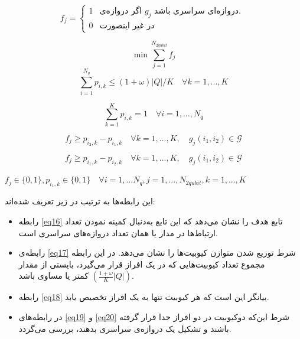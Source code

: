 \[
f_{j}=
\begin{cases}
 1& \text{اگر دروازه‌ی $g_j$ دروازه‌ای سراسری باشد. }\\
0& \text{در غیر اینصورت}
 \end{cases}
\]


\begin{equation}
\min \sum\limits_{j=1}^{N_{2qubit}} f_{j} 
\label{eq16}
\end{equation}
\begin{equation}
\sum\limits_{i=1}^{N_{q}} p_{i,k} \leq (1+\omega)|Q| /K \quad \forall k=1,...,K
\label{eq17}
\end{equation}

\begin{equation}
\sum\limits_{k=1}^K p_{i,k}=1    \quad \forall i=1,...,N_q
\label{eq18}
\end{equation}

\begin{equation}
f_{j}\geq p_{i_2,k}-p_{i_1,k} \quad \forall k=1,...,K, \quad g_j(i_{1},i_{2}) \in\mathcal{G}
\label{eq19}
\end{equation}

\begin{equation}
f_{j}\geq p_{i_1,k}-p_{i_2,k} \quad \forall k=1,...,K, \quad g_j(i_{1},i_{2}) \in\mathcal{G}
\label{eq20}
\end{equation}

 $f_{j} \in\{0,1\}, p_{i_1,k}\in\{0,1\} \quad \forall i=1,...N_{q}, j=1,...,N_{2qubit}, k=1,...,K$

 این رابطه‌ها به ترتیب در زیر تعریف شده‌اند:
\begin{itemize}
\item
رابطه \eqref{eq16} تابع هدف را نشان می‌دهد که این تابع به‌دنبال کمینه نمودن تعداد ارتباط‌‌ها در مدار یا همان تعداد دروازه‌های سراسری است.
\item
رابطه‌ی \eqref{eq17} شرط توزیع شدن متوازن کیوبیت‌ها را نشان می‌دهد. در این رابطه مجموع تعداد کیوبیت‌هایی که در یک افراز قرار می‌گیرد، بایستی از مقدار $(\frac{1+\omega}{K}|Q|)$ کمتر یا مساوی باشد.
\item

رابطه \eqref{eq18} بیانگر این است که هر کیوبیت تنها به یک افراز تخصیص یابد. 
\item
در رابطه‌های \eqref{eq19} و \eqref{eq20} شرط این‌که دوکیوبیت در دو افراز جدا قرار گرفته باشند و تشکیل یک دروازه‌ی سراسری بدهند، بررسی می‌گردد.
\end{itemize}




